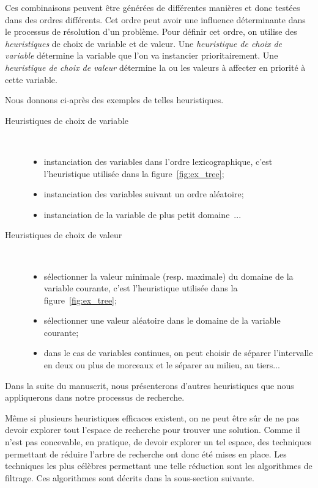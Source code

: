 Ces combinaisons peuvent être générées de différentes manières et donc
testées dans des ordres différents. Cet ordre peut avoir une influence
déterminante dans le processus de résolution d'un problème. Pour
définir cet ordre, on utilise des {\it heuristiques} de choix de
variable et de valeur. Une {\it heuristique de choix de
  variable} détermine la variable que l'on va instancier
prioritairement. Une {\it heuristique de choix de
  valeur} détermine la ou les valeurs à affecter en priorité à
cette variable. 

Nous donnons ci-après des exemples de telles heuristiques. 
\begin{description}
\item[Heuristiques de choix de variable]~

  \begin{itemize}
  \item instanciation des variables dans l'ordre lexicographique,
    c'est l'heuristique utilisée dans la figure~\ref{fig:ex_tree};
  \item instanciation des variables suivant un ordre aléatoire;
  \item instanciation de la variable de plus petit domaine~\cite{min_dom}...
  \end{itemize}
\item[Heuristiques de choix de valeur] ~

  \begin{itemize}
  \item sélectionner la valeur minimale (resp. maximale) du domaine de
    la variable courante, c'est l'heuristique utilisée dans la
    figure~\ref{fig:ex_tree}; 
  \item sélectionner une valeur aléatoire dans le domaine de la
    variable courante;
  \item dans le cas de variables continues, on peut choisir de séparer
    l'intervalle en deux ou plus de morceaux et le séparer au milieu,
    au tiers...
  \end{itemize}
\end{description}
Dans la suite du manuscrit, nous présenterons d'autres heuristiques
que nous appliquerons dans notre processus de recherche. 

Même si plusieurs heuristiques efficaces existent, on ne peut être sûr
de ne pas devoir explorer tout l'espace de recherche pour trouver une
solution. Comme il n'est pas concevable, en pratique, de devoir
explorer un tel espace, des techniques permettant de réduire l'arbre
de recherche ont donc été mises en place. Les techniques les plus
célèbres permettant une telle réduction sont les algorithmes de
filtrage. Ces algorithmes sont décrits dans la sous-section suivante.

